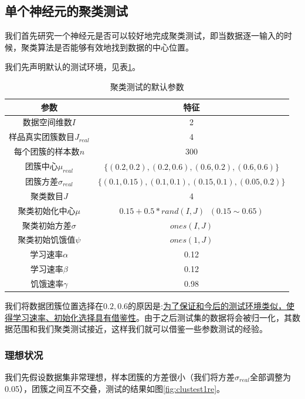 \subsection{单个神经元的聚类测试}
我们首先研究一个神经元是否可以较好地完成聚类测试，即当数据逐一输入的时候，聚类算法是否能够有效地找到数据的中心位置。

我们先声明默认的测试环境，见表\ref{tab:clusterpara}。
\begin{table}[htbp]
\centering
\begin{tabular}{c|c}
  \hline
  参数   & 特征 \\
  \hline
  数据空间维数$I$  &   2 \\
  \hline
  样品真实团簇数目$J_{real}$    & 4 \\
  每个团簇的样本数$n$    & 300 \\
  团簇中心$\mu_{real}$    & $\{(0.2,0.2), (0.2,0.6), (0.6,0.2), (0.6,0.6)\}$ \\
  团簇方差$\sigma_{real}$   & $\{(0.1,0.15), (0.1,0.1), (0.15,0.1), (0.05, 0.2)\}$ \\
  \hline
  聚类数目$J$    &  4 \\
  聚类初始化中心$\mu$  &   $0.15 + 0.5*rand(I,J)  \;\; (0.15\sim 0.65)$ \\
  聚类初始方差$\sigma$  &   $ones(I,J)$ \\
  聚类初始饥饿值$\psi$  &    $ones(1,J)$ \\
  \hline
  学习速率$\alpha$  &   0.12 \\
  学习速率$\beta$  &   0.12 \\
  饥饿速率$\gamma$  &   0.98 \\
  \hline
\end{tabular}
\caption{聚类测试的默认参数}
\label{tab:clusterpara}
\end{table}

我们将数据团簇位置选择在$0.2,0.6$的原因是:\uline{为了保证和今后的测试环境类似，使得学习速率、初始化选择具有借鉴性}。由于之后测试集的数据将会被归一化，其数据范围和我们聚类测试接近，这样我们就可以借鉴一些参数测试的经验。

\subsubsection{理想状况}
我们先假设数据集非常理想，样本团簇的方差很小（我们将方差$\sigma_{real}$全部调整为0.05），团簇之间互不交叠，测试的结果如图\ref{fig:clustest1re}。

